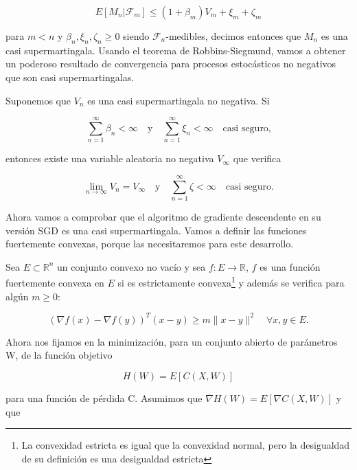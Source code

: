\begin{equation*}
	E[M_n | \mathcal{F}_m] \leq (1 + \beta _m ) V_m + \xi _m + \zeta _m
\end{equation*}

para $m<n$ y $\beta _n, \xi _n, \zeta _n \geq 0$ siendo $\mathcal{F}_n$-medibles, decimos entonces que $M_n$ es una casi supermartingala. Usando el teorema de Robbins-Siegmund, vamos a obtener un poderoso resultado de convergencia para procesos estocásticos no negativos que son casi supermartingalas.

\begin{teorema}\label{teor:sig}
	Suponemos que $V_n$ es una casi supermartingala no negativa. Si 

	$$ \sum_{n=1}^{\infty} \beta_n < \infty \quad \text{y} \quad \sum_{n=1}^{\infty} \xi_n < \infty \quad \text{casi seguro,}$$

	entonces existe una variable aleatoria no negativa $V_{\infty}$ que verifica

	$$ \displaystyle \lim_{n \to \infty}V_n = V_{\infty} \quad \text{y} \quad \sum_{n=1}^{\infty} \zeta < \infty \quad \text{casi seguro.}$$
\end{teorema}


Ahora vamos a comprobar que el algoritmo de gradiente descendente en su versión SGD es una casi supermartingala. Vamos a definir las funciones fuertemente convexas, porque las necesitaremos para este desarrollo. 

\begin{definicion}
	Sea $E \subset \mathbb{R}^n$ un conjunto convexo no vacío y sea $f:E \rightarrow \mathbb{R}$, $f$ es una función fuertemente convexa en $E$ si es estrictamente convexa\footnote{La convexidad estricta es igual que la convexidad normal, pero la desigualdad de su definición es una desigualdad estricta} y además se verifica para algún $m \geq 0$:

   	$$( \nabla f(x) - \nabla f(y))^T(x-y) \geq m \|x-y\|^2 \quad  \forall x,y \in E.$$
\end{definicion}

Ahora nos fijamos en la minimización, para un conjunto abierto de parámetros W, de la función objetivo

\begin{equation*}
	H(W) = E[ C(X,W)]
\end{equation*}

para una función de pérdida C. Asumimos que $\nabla H(W) = E[\nabla C(X, W)]$ y que 

